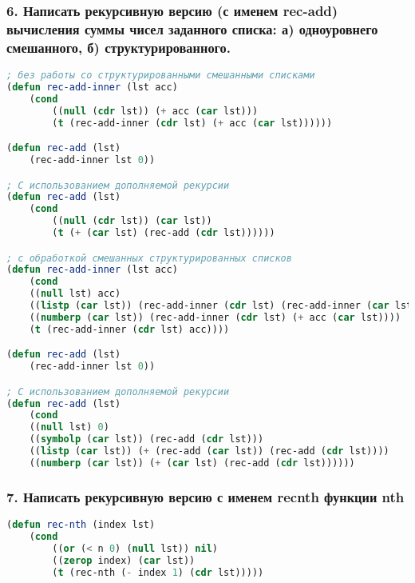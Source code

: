 \subsubsection*{6.  Написать рекурсивную версию (с именем rec-add) вычисления суммы чисел заданного списка: \newline а) одноуровнего смешанного, \newline б) структурированного.}
\begin{lstlisting}[language=Lisp]
; без работы со структурированными смешанными списками
(defun rec-add-inner (lst acc)
	(cond 
		((null (cdr lst)) (+ acc (car lst)))
		(t (rec-add-inner (cdr lst) (+ acc (car lst))))))

(defun rec-add (lst)
	(rec-add-inner lst 0))

; С использованием дополняемой рекурсии
(defun rec-add (lst)
	(cond
		((null (cdr lst)) (car lst))
		(t (+ (car lst) (rec-add (cdr lst))))))

; с обработкой смешанных структурированных списков
(defun rec-add-inner (lst acc)
	(cond
	((null lst) acc)
	((listp (car lst)) (rec-add-inner (cdr lst) (rec-add-inner (car lst) acc )))
	((numberp (car lst)) (rec-add-inner (cdr lst) (+ acc (car lst))))
	(t (rec-add-inner (cdr lst) acc))))

(defun rec-add (lst)
	(rec-add-inner lst 0))

; С использованием дополняемой рекурсии
(defun rec-add (lst)
	(cond
	((null lst) 0)
	((symbolp (car lst)) (rec-add (cdr lst)))
	((listp (car lst)) (+ (rec-add (car lst)) (rec-add (cdr lst))))
	((numberp (car lst)) (+ (car lst) (rec-add (cdr lst))))))
\end{lstlisting}

\newpage
\subsubsection*{7. Написать рекурсивную версию с именем recnth функции nth}
\begin{lstlisting}[language=Lisp]
(defun rec-nth (index lst)
	(cond 
		((or (< n 0) (null lst)) nil)
		((zerop index) (car lst))
		(t (rec-nth (- index 1) (cdr lst)))))
\end{lstlisting}


